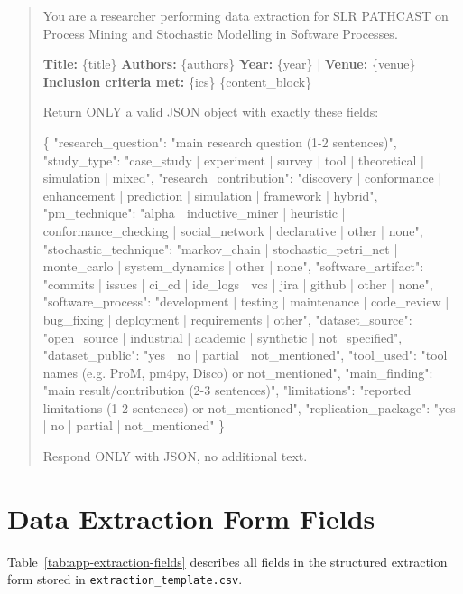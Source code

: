 \begin{quote}
\small\ttfamily
You are a researcher performing data extraction for SLR PATHCAST on
Process Mining and Stochastic Modelling in Software Processes.

\textbf{Title:} \{title\}
\textbf{Authors:} \{authors\}
\textbf{Year:} \{year\} | \textbf{Venue:} \{venue\}
\textbf{Inclusion criteria met:} \{ics\}
\{content\_block\}

Return ONLY a valid JSON object with exactly these fields:

\{
  "research\_question": "main research question (1-2 sentences)",
  "study\_type": "case\_study | experiment | survey | tool |
                 theoretical | simulation | mixed",
  "research\_contribution": "discovery | conformance | enhancement |
       prediction | simulation | framework | hybrid",
  "pm\_technique": "alpha | inductive\_miner | heuristic |
       conformance\_checking | social\_network | declarative |
       other | none",
  "stochastic\_technique": "markov\_chain | stochastic\_petri\_net |
       monte\_carlo | system\_dynamics | other | none",
  "software\_artifact": "commits | issues | ci\_cd | ide\_logs |
       vcs | jira | github | other | none",
  "software\_process": "development | testing | maintenance |
       code\_review | bug\_fixing | deployment | requirements | other",
  "dataset\_source": "open\_source | industrial | academic |
                     synthetic | not\_specified",
  "dataset\_public": "yes | no | partial | not\_mentioned",
  "tool\_used": "tool names (e.g. ProM, pm4py, Disco) or
                not\_mentioned",
  "main\_finding": "main result/contribution (2-3 sentences)",
  "limitations": "reported limitations (1-2 sentences) or
                 not\_mentioned",
  "replication\_package": "yes | no | partial | not\_mentioned"
\}

Respond ONLY with JSON, no additional text.
\end{quote}

\section{Data Extraction Form Fields}
\label{app:slr-extraction-fields}

Table~\ref{tab:app-extraction-fields} describes all fields in the structured
extraction form stored in \texttt{extraction\_template.csv}.

